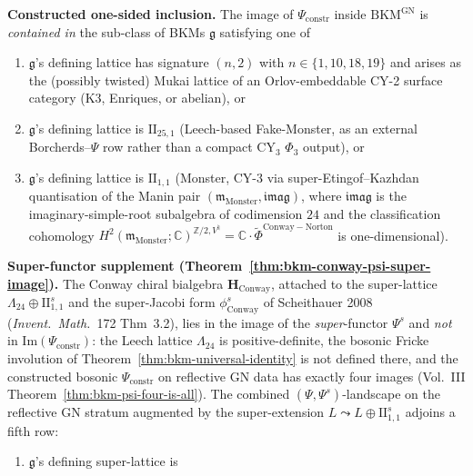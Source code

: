 \begin{corollary}
\label{cor:psi-image-characterization}
\textbf{Constructed one-sided inclusion.} The image of $\Psi_{\mathrm{constr}}$ inside $\mathrm{BKM}^{\mathrm{GN}}$ is \emph{contained in} the sub-class of BKMs $\mathfrak{g}$ satisfying one of
\begin{enumerate}[label=\textup{(\roman*)}]
 \item $\mathfrak{g}$'s defining lattice has signature $(n, 2)$ with $n \in \{1, 10, 18, 19\}$ and arises as the (possibly twisted) Mukai lattice of an Orlov-embeddable CY-2 surface category (K3, Enriques, or abelian), or
 \item $\mathfrak{g}$'s defining lattice is $\mathrm{II}_{25,1}$ (Leech-based Fake-Monster, as an external Borcherds--$\Psi$ row rather than a compact CY$_3$ $\Phi_3$ output), or
 \item $\mathfrak{g}$'s defining lattice is $\mathrm{II}_{1,1}$ (Monster, CY-3 via super-Etingof--Kazhdan quantisation of the Manin pair $(\mathfrak m_{\mathrm{Monster}}, \mathfrak{imag})$, where $\mathfrak{imag}$ is the imaginary-simple-root subalgebra of codimension $24$ and the classification cohomology $H^2(\mathfrak m_{\mathrm{Monster}}; \mathbb C)^{\mathbb Z/2, V^\natural} = \mathbb C \cdot \widetilde\Phi^{\mathrm{Conway-Norton}}$ is one-dimensional).
\end{enumerate}
\textbf{Super-functor supplement (Theorem~\ref{thm:bkm-conway-psi-super-image}).}
The Conway chiral bialgebra
$\mathbf{H}_{\mathrm{Conway}}$, attached to the super-lattice
$\Lambda_{24}\oplus\mathrm{II}_{1,1}^{s}$ and the super-Jacobi form
$\phi^{s}_{\mathrm{Conway}}$ of Scheithauer 2008
(\emph{Invent.\ Math.}~172 Thm~3.2), lies in the image of the
\emph{super}-functor $\Psi^{s}$ and \emph{not} in
$\mathrm{Im}(\Psi_{\mathrm{constr}})$: the Leech lattice $\Lambda_{24}$ is
positive-definite, the bosonic Fricke involution of
Theorem~\ref{thm:bkm-universal-identity} is not defined there, and
the constructed bosonic $\Psi_{\mathrm{constr}}$ on reflective GN data has exactly four images
(Vol.~III Theorem~\ref{thm:bkm-psi-four-is-all}). The combined
$(\Psi,\Psi^{s})$-landscape on the reflective GN stratum augmented
by the super-extension $L \leadsto L\oplus\mathrm{II}_{1,1}^{s}$
adjoins a fifth row:
\begin{enumerate}[label=\textup{(\roman*$'$)}, resume]
 \item[(iv)] $\mathfrak{g}$'s defining super-lattice is

\end{enumerate}
\end{corollary}
